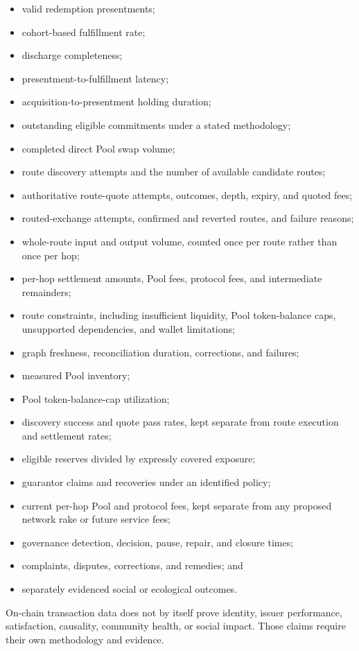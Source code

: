 \documentclass[11pt]{article}
\begin{document}
\begin{itemize}[leftmargin=*]
\item valid redemption presentments;
\item cohort-based fulfillment rate;
\item discharge completeness;
\item presentment-to-fulfillment latency;
\item acquisition-to-presentment holding duration;
\item outstanding eligible commitments under a stated methodology;
\item completed direct Pool swap volume;
\item route discovery attempts and the number of available candidate routes;
\item authoritative route-quote attempts, outcomes, depth, expiry, and quoted fees;
\item routed-exchange attempts, confirmed and reverted routes, and failure reasons;
\item whole-route input and output volume, counted once per route rather than once per hop;
\item per-hop settlement amounts, Pool fees, protocol fees, and intermediate remainders;
\item route constraints, including insufficient liquidity, Pool token-balance caps, unsupported dependencies, and wallet limitations;
\item graph freshness, reconciliation duration, corrections, and failures;
\item measured Pool inventory;
\item Pool token-balance-cap utilization;
\item discovery success and quote pass rates, kept separate from route execution and settlement rates;
\item eligible reserves divided by expressly covered exposure;
\item guarantor claims and recoveries under an identified policy;
\item current per-hop Pool and protocol fees, kept separate from any proposed network rake or future service fees;
\item governance detection, decision, pause, repair, and closure times;
\item complaints, disputes, corrections, and remedies; and
\item separately evidenced social or ecological outcomes.
\end{itemize}
On-chain transaction data does not by itself prove identity, issuer performance, satisfaction, causality, community health, or social impact. Those claims require their own methodology and evidence.
\end{document}
